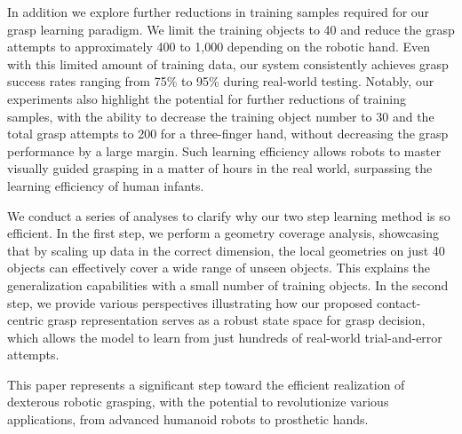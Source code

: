 In addition we explore further reductions in training samples required for our grasp learning paradigm. We limit the training objects to 40 and reduce the grasp attempts to approximately 400 to 1,000 depending on the robotic hand. Even with this limited amount of training data, our system consistently achieves grasp success rates ranging from 75\% to 95\% during real-world testing. Notably, our experiments also highlight the potential for further reductions of training samples, with the ability to decrease the training object number to 30 and the total grasp attempts to 200 for a three-finger hand, without decreasing the grasp performance by a large margin.  Such learning efficiency allows robots to master visually guided grasping in a matter of hours in the real world, surpassing the learning efficiency of human infants.

We conduct a series of analyses to clarify why our two step learning method is so efficient. In the first step, we perform a geometry coverage analysis, showcasing that by scaling up data in the correct dimension, the local geometries on just 40 objects can effectively cover a wide range of unseen objects. This explains the generalization capabilities with a small number of training objects. In the second step, we provide various perspectives illustrating how our proposed contact-centric grasp representation serves as a robust state space for grasp decision, which allows the model to learn from just hundreds of real-world trial-and-error attempts.

This paper represents a significant step toward the efficient realization of dexterous robotic grasping, with the potential to revolutionize various applications, from advanced humanoid robots to prosthetic hands.